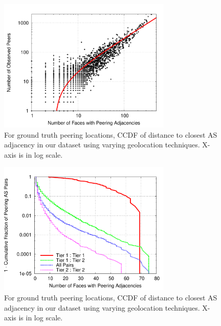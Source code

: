 \begin{figure}[tb]
\centering
\includegraphics[width=3.25in]{scatter}
\caption[]{For ground truth peering locations, CCDF of distance to closest AS
adjacency in our dataset using varying geolocation techniques. X-axis is in log
scale.} 
\end{figure}


\begin{figure}[tb]
\centering
\includegraphics[width=3.25in]{peering}
\caption[]{For ground truth peering locations, CCDF of distance to closest AS
adjacency in our dataset using varying geolocation techniques. X-axis is in log
scale.} 
\end{figure}


